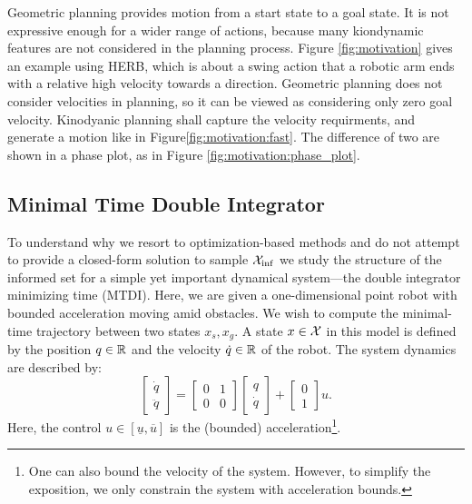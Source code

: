 \documentclass[letterpaper, 10 pt, conference]{ieeeconf}  %
\begin{document}
Geometric planning provides motion from a start state to a goal state.
It is not expressive enough for a wider range of actions, because many kiondynamic features are not considered in the planning process.
Figure \ref{fig:motivation} gives an example using HERB, which is about a swing action that a robotic arm ends with a relative high velocity towards a direction.
Geometric planning does not consider velocities in planning, so it can be viewed as considering only zero goal velocity.
Kinodyanic planning shall capture the velocity requirments, and generate a motion like in Figure\ref{fig:motivation:fast}.
The difference of two are shown in a phase plot, as in Figure \ref{fig:motivation:phase_plot}.


\subsection{Minimal Time Double Integrator}
To understand why we resort to optimization-based methods and do not attempt to provide a closed-form solution to sample $\mathcal{X}_{\rm {inf}}$ we study the structure of the informed set for a simple yet important dynamical system---the double integrator minimizing time (MTDI). 
Here, we are given a one-dimensional point robot with bounded acceleration moving amid obstacles. We wish to compute the minimal-time trajectory between two states $x_s, x_g$.
A state $x \in \mathcal{X}$ in this model is defined by 
the position $q \in \mathbb{R}$
and
the velocity $\dot{q}\in \mathbb{R}$ of the robot.
The system dynamics are described by:
\begin{equation}
\begin{bmatrix}
	\dot{q} \\
	\ddot{q}
\end{bmatrix}
=
\begin{bmatrix}
	0 & 1 \\
	0 & 0
\end{bmatrix}
\begin{bmatrix}
	{q} \\
	\dot{q}
\end{bmatrix}
+
\begin{bmatrix}
	0 \\
	1
\end{bmatrix}
u.
\end{equation}
Here, the control 
$u \in [\underline{u}, \overline{u}]$ 
is the (bounded) acceleration\footnote{One can also bound the velocity of the system. However, to simplify the exposition, we only constrain the system with acceleration bounds.}. 
\end{document}
